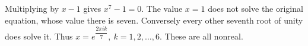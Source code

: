Multiplying by $ x-1 $ gives $ x^7-1=0 $. The value $ x=1 $ does not solve the original equation, whose value there is seven. Conversely every other seventh root of unity does solve it. Thus $\boxed{x=e^{\dfrac{2\pi i k}{7}},\ k=1,2,\ldots,6}$. These are all nonreal.
